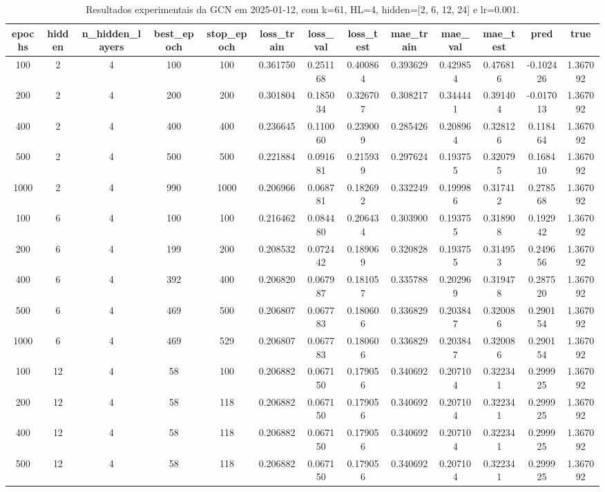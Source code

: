 \begin{table}[h]
\centering
\caption{Resultados experimentais da GCN em 2025-01-12, com k=61, HL=4, hidden=[2, 6, 12, 24] e lr=0.001.}
\label{tab:gcn_results_k61_hl4_d20250112}
\begin{tabular}{ccccccccccccc}
\toprule
epochs & hidden & n\_hidden\_layers & best\_epoch & stop\_epoch & loss\_train & loss\_val & loss\_test & mae\_train & mae\_val & mae\_test & pred & true \\
\midrule
100 & 2 & 4 & 100 & 100 & 0.361750 & 0.251168 & 0.400864 & 0.393629 & 0.429854 & 0.476816 & -0.102426 & 1.367092 \\
200 & 2 & 4 & 200 & 200 & 0.301804 & 0.185034 & 0.326707 & 0.308217 & 0.344441 & 0.391404 & -0.017013 & 1.367092 \\
400 & 2 & 4 & 400 & 400 & 0.236645 & 0.110060 & 0.239009 & 0.285426 & 0.208964 & 0.328126 & 0.118464 & 1.367092 \\
500 & 2 & 4 & 500 & 500 & 0.221884 & 0.091681 & 0.215939 & 0.297624 & 0.193755 & 0.320795 & 0.168410 & 1.367092 \\
1000 & 2 & 4 & 990 & 1000 & 0.206966 & 0.068781 & 0.182692 & 0.332249 & 0.199986 & 0.317412 & 0.278568 & 1.367092 \\
100 & 6 & 4 & 100 & 100 & 0.216462 & 0.084480 & 0.206434 & 0.303900 & 0.193755 & 0.318908 & 0.192942 & 1.367092 \\
200 & 6 & 4 & 199 & 200 & 0.208532 & 0.072442 & 0.189069 & 0.320828 & 0.193755 & 0.314953 & 0.249656 & 1.367092 \\
400 & 6 & 4 & 392 & 400 & 0.206820 & 0.067987 & 0.181057 & 0.335788 & 0.202969 & 0.319478 & 0.287520 & 1.367092 \\
500 & 6 & 4 & 469 & 500 & 0.206807 & 0.067783 & 0.180606 & 0.336829 & 0.203847 & 0.320086 & 0.290154 & 1.367092 \\
1000 & 6 & 4 & 469 & 529 & 0.206807 & 0.067783 & 0.180606 & 0.336829 & 0.203847 & 0.320086 & 0.290154 & 1.367092 \\
100 & 12 & 4 & 58 & 100 & 0.206882 & 0.067150 & 0.179056 & 0.340692 & 0.207104 & 0.322341 & 0.299925 & 1.367092 \\
200 & 12 & 4 & 58 & 118 & 0.206882 & 0.067150 & 0.179056 & 0.340692 & 0.207104 & 0.322341 & 0.299925 & 1.367092 \\
400 & 12 & 4 & 58 & 118 & 0.206882 & 0.067150 & 0.179056 & 0.340692 & 0.207104 & 0.322341 & 0.299925 & 1.367092 \\
500 & 12 & 4 & 58 & 118 & 0.206882 & 0.067150 & 0.179056 & 0.340692 & 0.207104 & 0.322341 & 0.299925 & 1.367092 \\

\end{tabular}
\end{table}
